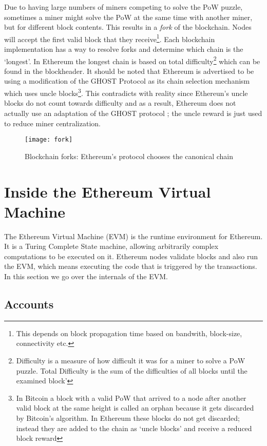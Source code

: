 Due to having large numbers of miners competing to solve the PoW puzzle, sometimes a miner might solve the PoW at the same time with another miner, but for different block contents. This results in a \textit{fork} of the blockchain. Nodes will accept the first valid block that they receive\footnote{This depends on block propagation time based on bandwith, block-size, connectivity etc.}. Each blockchain implementation has a way to resolve forks and determine which chain is the `longest'. In Ethereum the longest chain is based on total difficulty\footnote{Difficulty is a measure of how difficult it was for a miner to solve a PoW puzzle. Total Difficulty is the sum of the difficulties of all blocks until the examined block'} which can be found in the blockheader. It should be noted that Ethereum is advertised to be using a modification of the GHOST Protocol\cite{GHOST} as its chain selection mechanism which uses uncle blocks\footnote{In Bitcoin a block with a valid PoW that arrived to a node after another valid block at the same height is called an orphan because it gets discarded by Bitcoin's algorithm. In Ethereum these blocks do not get discarded; instead they are added to the chain as `uncle blocks' and receive a reduced block reward}. This contradicts with reality since Ethereun's uncle blocks do not count towards difficulty and as a result, Ethereum does not actually use an adaptation of the GHOST protocol \cite{Gervais:2016:SPP:2976749.2978341}; the uncle reward is just used to reduce miner centralization.

\begin{figure}[H]
    \centering
    \texttt{[image: fork]}
    \caption{Blockchain forks: Ethereum's protocol chooses the canonical chain \cite{preethi}}
    \label{fig:forking}
\end{figure}

\section{Inside the Ethereum Virtual Machine}
The Ethereum Virtual Machine (EVM) is the runtime environment for Ethereum. It is a Turing Complete State machine, allowing arbitrarily complex computations to be executed on it. Ethereum nodes validate blocks and also run the EVM, which means executing the code that is triggered by the transactions. In this section we go over the internals of the EVM. 

\subsection{Accounts}

